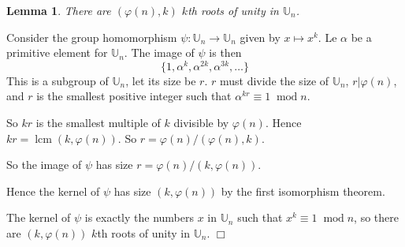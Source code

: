 \documentclass[10pt]{article}
\newtheorem{lemma}[theorem]{Lemma}
\newenvironment{proof}[1][Proof]{\begin{trivlist}
\item[\hskip \labelsep {\bfseries #1}]}{\end{trivlist}}
\newcommand{\modulo}[1]{\;\operatorname{mod} #1}
\begin{document}
    \begin{lemma}
        There are $(\varphi(n),k)$ $k$th roots of unity in $\mathbb{U}_n$.
    \end{lemma}
    \begin{proof}
        Consider the group homomorphism $\psi:\mathbb{U}_n\rightarrow\mathbb{U}_n$
        given by $x\mapsto x^k$.         Le $\alpha$ be a primitive element for $\mathbb{U}_n$.
        The image of $\psi$ is then
        \begin{equation*}
            \{1,\alpha^k,\alpha^{2k},\alpha^{3k},\ldots\}
        \end{equation*}
        This is a subgroup of $\mathbb{U}_n$, let its size be $r$. 
        $r$ must divide the size of $\mathbb{U}_n$, $r|\varphi(n)$, and $r$ is the smallest
        positive integer such that $\alpha^{kr}\equiv 1\modulo{n}$. 
        
        So $kr$ is the smallest multiple of $k$ divisible
        by $\varphi(n)$. Hence $kr = \operatorname{lcm}(k,\varphi(n))$.
        So $r = \varphi(n)/(\varphi(n),k)$.
        
        
        
        
        
        So the image of $\psi$ has size $r = \varphi(n)/(k,\varphi(n))$.
        
        Hence the kernel of $\psi$ has size $(k,\varphi(n))$ by the first isomorphism
        theorem.
        
        The kernel of $\psi$ is exactly the numbers $x$ in $\mathbb{U}_n$
        such that $x^k \equiv 1\modulo{n}$, so there are $(k,\varphi(n))$ 
        $k$th roots of unity in $\mathbb{U}_n$. $\Box$

    \end{proof}
    
\end{document}
